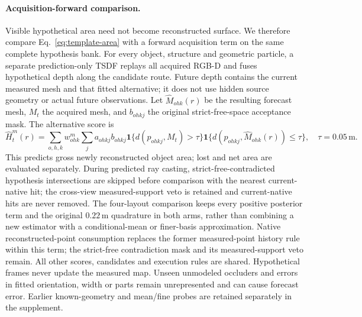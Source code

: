 \paragraph{Acquisition-forward comparison.}
Visible hypothetical area need not become reconstructed surface. We therefore compare Eq.~\ref{eq:template-area} with a forward acquisition term on the same complete hypothesis bank. For every object, structure and geometric particle, a separate prediction-only TSDF replays all acquired RGB-D and fuses hypothetical depth along the candidate route. Future depth contains the current measured mesh and that fitted alternative; it does not use hidden source geometry or actual future observations. Let $\widehat M_{ohk}(r)$ be the resulting forecast mesh, $M_t$ the acquired mesh, and $b_{ohkj}$ the original strict-free-space acceptance mask. The alternative score is
\begin{equation}
\widehat H_t^m(r)=\sum_{o,h,k}w_{ohk}^m
\sum_j a_{ohkj}b_{ohkj}
\mathbf 1\{d(p_{ohkj},M_t)>\tau\}
\mathbf 1\{d(p_{ohkj},\widehat M_{ohk}(r))\leq\tau\},
\quad \tau=0.05\,\mathrm m.
\label{eq:acquisition-reward}
\end{equation}
This predicts gross newly reconstructed object area; lost and net area are evaluated separately. During predicted ray casting, strict-free-contradicted hypothesis intersections are skipped before comparison with the nearest current-native hit; the cross-view measured-support veto is retained and current-native hits are never removed. The four-layout comparison keeps every positive posterior term and the original $0.22\,$m quadrature in both arms, rather than combining a new estimator with a conditional-mean or finer-basis approximation. Native reconstructed-point consumption replaces the former measured-point history rule within this term; the strict-free contradiction mask and its measured-support veto remain. All other scores, candidates and execution rules are shared. Hypothetical frames never update the measured map. Unseen unmodeled occluders and errors in fitted orientation, width or parts remain unrepresented and can cause forecast error. Earlier known-geometry and mean/fine probes are retained separately in the supplement.

